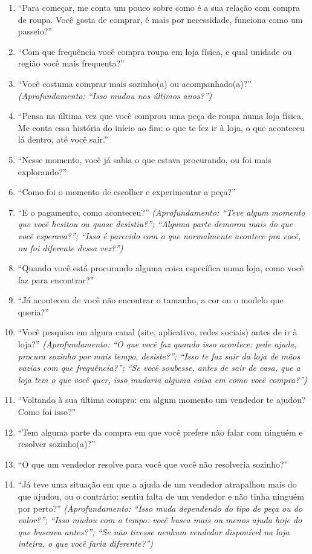 \begin{enumerate}
    \item ``Para começar, me conta um pouco sobre como é a sua relação com compra de roupa. Você gosta de comprar, é mais por necessidade, funciona como um passeio?''
    \item ``Com que frequência você compra roupa em loja física, e qual unidade ou região você mais frequenta?''
    \item ``Você costuma comprar mais sozinho(a) ou acompanhado(a)?'' \textit{(Aprofundamento: ``Isso mudou nos últimos anos?'')}
    \item ``Pensa na última vez que você comprou uma peça de roupa numa loja física. Me conta essa história do início ao fim: o que te fez ir à loja, o que aconteceu lá dentro, até você sair.''
    \item ``Nesse momento, você já sabia o que estava procurando, ou foi mais explorando?''
    \item ``Como foi o momento de escolher e experimentar a peça?''
    \item ``E o pagamento, como aconteceu?'' \textit{(Aprofundamento: ``Teve algum momento que você hesitou ou quase desistiu?''; ``Alguma parte demorou mais do que você esperava?''; ``Isso é parecido com o que normalmente acontece pra você, ou foi diferente dessa vez?'')}
    \item ``Quando você está procurando alguma coisa específica numa loja, como você faz para encontrar?''
    \item ``Já aconteceu de você não encontrar o tamanho, a cor ou o modelo que queria?''
    \item ``Você pesquisa em algum canal (site, aplicativo, redes sociais) antes de ir à loja?'' \textit{(Aprofundamento: ``O que você faz quando isso acontece: pede ajuda, procura sozinho por mais tempo, desiste?''; ``Isso te faz sair da loja de mãos vazias com que frequência?''; ``Se você soubesse, antes de sair de casa, que a loja tem o que você quer, isso mudaria alguma coisa em como você compra?'')}
    \item ``Voltando à sua última compra: em algum momento um vendedor te ajudou? Como foi isso?''
    \item ``Tem alguma parte da compra em que você prefere não falar com ninguém e resolver sozinho(a)?''
    \item ``O que um vendedor resolve para você que você não resolveria sozinho?''
    \item ``Já teve uma situação em que a ajuda de um vendedor atrapalhou mais do que ajudou, ou o contrário: sentiu falta de um vendedor e não tinha ninguém por perto?'' \textit{(Aprofundamento: ``Isso muda dependendo do tipo de peça ou do valor?''; ``Isso mudou com o tempo: você busca mais ou menos ajuda hoje do que buscava antes?''; ``Se não tivesse nenhum vendedor disponível na loja inteira, o que você faria diferente?'')}

\end{enumerate}
